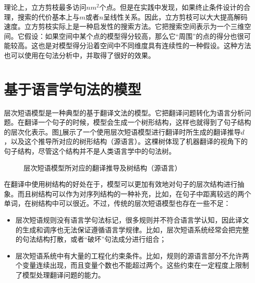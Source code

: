 \parinterval 理论上，立方剪枝最多访问$n{m}^2$个点。但是在实践中发现，如果终止条件设计的合理，搜索的代价基本上与$m$或者$n$呈线性关系。因此，立方剪枝可以大大提高解码速度。立方剪枝实际上是一种启发性的搜索方法。它把搜索空间表示为一个三维空间。它假设：如果空间中某个点的模型得分较高，那么它“周围”的点的得分也很可能较高。这也是对模型得分沿着空间中不同维度具有连续性的一种假设。这种方法也可以使用在句法分析中，并取得了很好的效果。


\sectionnewpage
\section{基于语言学句法的模型}\label{section-8.3}

\parinterval 层次短语模型是一种典型的基于翻译文法的模型。它把翻译问题转化为语言分析问题。在翻译一个句子的时候，模型会生成一个树形结构，这样也就得到了句子结构的层次化表示。图\ref{fig:8-14}展示了一个使用层次短语模型进行翻译时所生成的翻译推导$d$，以及这个推导所对应的树形结构（源语言）。这棵树体现了机器翻译的视角下的句子结构，尽管这个结构并不是人类语言学中的句法树。

\begin{figure}[htp]
\centering

\setlength{\belowcaptionskip}{-0.5em}
\caption{层次短语模型所对应的翻译推导及树结构（源语言）}
\label{fig:8-14}
\end{figure}

\parinterval 在翻译中使用树结构的好处在于，模型可以更加有效地对句子的层次结构进行抽象。而且树结构可以作为对序列结构的一种补充，比如，在句子中距离较远的两个单词，在树结构中可以很近。不过，传统的层次短语模型也存在一些不足：

\begin{itemize}
\vspace{0.5em}
\item 层次短语规则没有语言学句法标记，很多规则并不符合语言学认知，因此译文的生成和调序也无法保证遵循语言学规律。比如，层次短语系统经常会把完整的句法结构打散，或者“破坏”句法成分进行组合；
\vspace{0.5em}
\item 层次短语系统中有大量的工程化约束条件。比如，规则的源语言部分不允许两个变量连续出现，而且变量个数也不能超过两个。这些约束在一定程度上限制了模型处理翻译问题的能力。
\vspace{0.5em}
\end{itemize}

